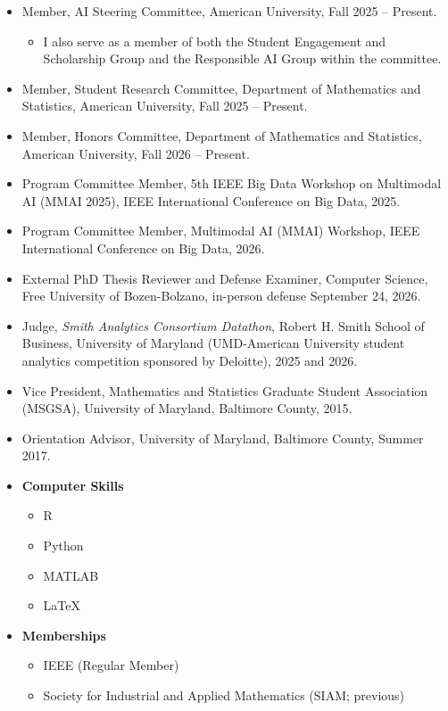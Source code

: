 \documentclass[letterpaper,11pt]{article}
\newcommand{\resitem}[1]{\item #1 \vspace{-2pt}}
\newcommand{\resheading}[1]{\par\vspace{0.6em}\noindent{\large\textbf{#1}}\par\vspace{0.25em}}
\begin{document}
\resheading{\LARGE{Service}}
\begin{itemize}
  \resitem{Member, AI Steering Committee, American University, Fall 2025 -- Present.}
\begin{itemize}
    \resitem{I also serve as a member of both the Student Engagement and Scholarship Group and the Responsible AI Group within the committee.}
\end{itemize}

  \resitem{Member, Student Research Committee, Department of Mathematics and Statistics, American University, Fall 2025 -- Present.}

  \resitem{Member, Honors Committee, Department of Mathematics and Statistics, American University, Fall 2026 -- Present.}

  \resitem{Program Committee Member, 5th IEEE Big Data Workshop on Multimodal AI (MMAI 2025), IEEE International Conference on Big Data, 2025.}

  \resitem{Program Committee Member, Multimodal AI (MMAI) Workshop, IEEE International Conference on Big Data, 2026.}

  \resitem{External PhD Thesis Reviewer and Defense Examiner, Computer Science, Free University of Bozen-Bolzano, in-person defense September 24, 2026.}

  \item Judge, \textit{Smith Analytics Consortium Datathon}, Robert H. Smith School of Business, University of Maryland (UMD-American University student analytics competition sponsored by Deloitte), 2025 and 2026.
  
  \resitem{Vice President, Mathematics and Statistics Graduate Student Association (MSGSA), University of Maryland, Baltimore County, 2015.}
  
  \resitem{Orientation Advisor, University of Maryland, Baltimore County, Summer 2017.}
\end{itemize}


\resheading{\LARGE{Miscellaneous}}
\begin{itemize}
\resitem{\textbf{Computer Skills}}
\begin{itemize}
    \resitem{R}
    \resitem{Python}
    \resitem{MATLAB}
    \resitem{\LaTeX}
\end{itemize}
\resitem{\textbf{Memberships}}
\begin{itemize}
    \resitem{IEEE (Regular Member)}
    \resitem{Society for Industrial and Applied Mathematics (SIAM; previous)}
\end{itemize}
\end{itemize}
%
\end{document}

